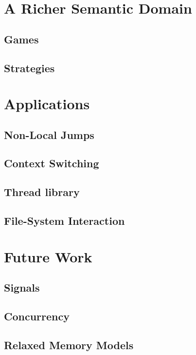 \documentclass[acmsmall,10pt,review,anonymous]{acmart}
\begin{document}


\section{A Richer Semantic Domain} %

\subsection{Games}
\subsection{Strategies}



\section{Applications} %

\subsection{Non-Local Jumps}
\subsection{Context Switching}
\subsection{Thread library}
\subsection{File-System Interaction}


\section{Future Work} %

\subsection{Signals}
\subsection{Concurrency}
\subsection{Relaxed Memory Models}
\end{document}
